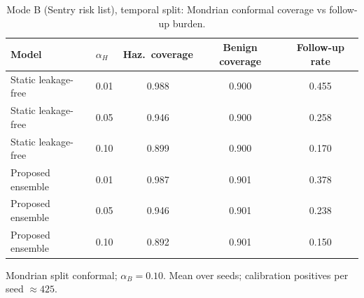 \begin{table}[t]
\centering
\small
\caption{Mode B (Sentry risk list), temporal split: Mondrian conformal coverage vs follow-up burden.}
\label{tab:conf_sentry_temporal}
\begin{tabular}{llccc}
\toprule
Model & $\alpha_H$ & Haz.\ coverage & Benign coverage & Follow-up rate \\
\midrule
Static leakage-free & 0.01 & 0.988 & 0.900 & 0.455 \\
Static leakage-free & 0.05 & 0.946 & 0.900 & 0.258 \\
Static leakage-free & 0.10 & 0.899 & 0.900 & 0.170 \\
\midrule
Proposed ensemble & 0.01 & 0.987 & 0.901 & 0.378 \\
Proposed ensemble & 0.05 & 0.946 & 0.901 & 0.238 \\
Proposed ensemble & 0.10 & 0.892 & 0.901 & 0.150 \\
\bottomrule
\end{tabular}
\par\vspace{2pt}\footnotesize Mondrian split conformal; $\alpha_B=0.10$. Mean over seeds; calibration positives per seed $\approx 425$.
\end{table}
